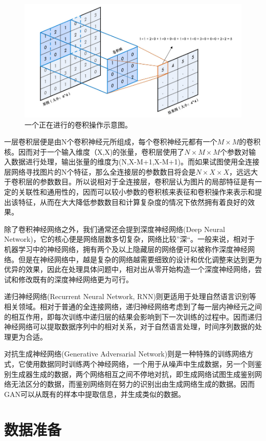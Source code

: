 \begin{figure}
    \centering
    \includegraphics[width=0.7\columnwidth]{pic/con.jpg}
    \caption{一个正在进行的卷积操作示意图\supercite{con}。}
    \label{fig:con}
\end{figure}

一层卷积层便是由N个卷积神经元所组成，每个卷积神经元都有一个$M \times M$的卷积核。因而对于一个输入维度（X,X)的张量，卷积层使用了$N\times M\times M$个参数对输入数据进行处理，输出张量的维度为(N,X-M+1,X-M+1)。而如果试图使用全连接层网络寻找图片的N个特征，那么全连接层的参数数目将会是$N\times X\times X$，远远大于卷积层的参数数目。所以说相对于全连接层，卷积层认为图片的局部特征是有一定的关联性和通用性的，因而可以较小参数的卷积核来表征和卷积操作来表示和提出该特征，从而在大大降低参数数目和计算复杂度的情况下依然拥有着良好的效果。

除了卷积神经网络之外，我们通常还会提到深度神经网络(Deep Neural Network)，它的核心便是网络层数多切复杂，网络比较”深“。一般来说，相对于机器学习中的神经网络，拥有两个及以上隐藏层的网络便可以被称作深度神经网络。但是在神经网络中，越是复杂的网络越需要细致的设计和优化调整来达到更为优异的效果，因此在处理具体问题中，相对出从零开始构造一个深度神经网络，尝试和修改既有的深度神经网络更为可行。

递归神经网络(Recurrent Neural Network, RNN)则更适用于处理自然语言识别等相关领域。相对于普通的全连接网络，递归神经网络考虑到了每一层内神经元之间的相互作用，即每次训练中递归层的结果会影响到下一次训练的过程中。因而递归神经网络可以提取数据序列中的相对关系，对于自然语言处理，时间序列数据的处理更为合适。

对抗生成神经网络(Generative Adversarial Network)则是一种特殊的训练网络方式，它使用数据同时训练两个神经网络，一个用于从噪声中生成数据，另一个则鉴别生成器生成的数据，两个网络相互之间不停地对抗，即生成网络试图生成鉴别网络无法区分的数据，而鉴别网络则在努力的识别出由生成网络生成的数据。因而GAN可以从既有的样本中提取信息，并生成类似的数据。

\section{数据准备}
\label{section:data_prepare}

